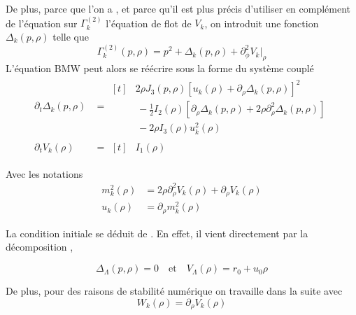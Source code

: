 \documentclass[10pt]{article}
\begin{document}
\begin{multicols}{2}
De plus, parce que l'on a , et parce qu'il est plus précis d'utiliser en complément de l'équation sur $\Gamma^{(2)}_k$ l'équation de flot de $V_k$, on introduit une fonction $\Delta_k(p, \rho)$ telle que
\begin{equation}
	\Gamma^{(2)}_k(p, \rho) = p^2 + \Delta_k(p, \rho) + \partial_{\phi}^2 V_k|_\rho
	\label{eq:gammaDecomp}
\end{equation}
L'équation BMW  peut alors se réécrire sous la forme du système couplé
\begin{align}
	\partial_t \Delta_k(p, \rho) & = 
	\begin{aligned}[t]
	 & 2\rho J_3(p,\rho){\left[u_k(\rho) + \partial_\rho \Delta_k (p,\rho) \right]}^{2} \\
	  & \, - \frac{1}{2}I_2(\rho) \left[\partial_\rho \Delta_k(p, \rho) +  2\rho \partial_\rho^2 \Delta_k(p,\rho) \right] \\
	 & \, - 2\rho I_3 (\rho) u_k^2(\rho) 
	 \end{aligned}
	\label{eqn:sys1}\\
	\partial_t V_k(\rho) & = 
	\begin{aligned}[t]
		& I_1(\rho)
	\end{aligned}
\end{align}

Avec les notations
\begin{equation}
 \begin{split}
	m_k^2(\rho) & = 2\rho \partial_\rho^2 V_k(\rho) + \partial_\rho V_k(\rho)  \\
	u_k(\rho)  & = \partial_\rho m^2_k(\rho)
	\end{split}	
\end{equation}

La condition initiale se déduit de . En effet, il vient directement par la décomposition ,

\begin{equation}
\Delta_\Lambda (p,\rho) = 0 \quad \text{et} \quad V_\Lambda(\rho) = r_0 + u_0\rho
\end{equation}

De plus, pour des raisons de stabilité numérique on travaille dans la suite avec
\begin{equation}
	W_k(\rho) = \partial_\rho V_k(\rho)
\end{equation}



\end{multicols}
\end{document}
